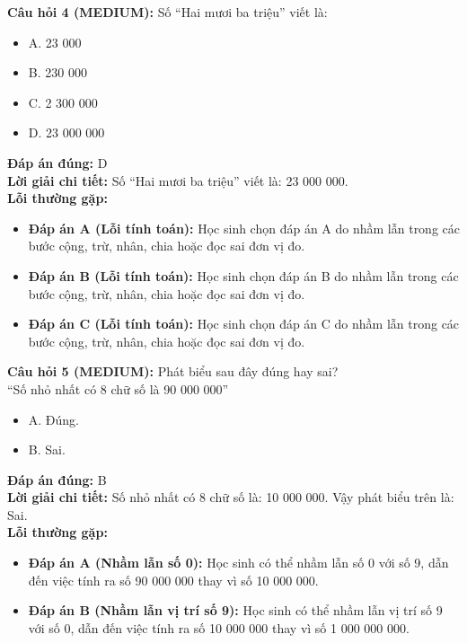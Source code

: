 \documentclass{article}
\begin{document}
\begin{minipage}{\textwidth}
\noindent\textbf{Câu hỏi 4 (MEDIUM):} Số “Hai mươi ba triệu” viết là: 
\begin{itemize}[label={}]
    \item A. 23 000
    \item B. 230 000
    \item C. 2 300 000
    \item D. 23 000 000
\end{itemize}
\textbf{Đáp án đúng:} D \\
\textbf{Lời giải chi tiết:} Số “Hai mươi ba triệu” viết là: 23 000 000. \\
\textbf{Lỗi thường gặp:}
\begin{itemize}
  \item \textbf{Đáp án A (Lỗi tính toán):} Học sinh chọn đáp án A do nhầm lẫn trong các bước cộng, trừ, nhân, chia hoặc đọc sai đơn vị đo.
  \item \textbf{Đáp án B (Lỗi tính toán):} Học sinh chọn đáp án B do nhầm lẫn trong các bước cộng, trừ, nhân, chia hoặc đọc sai đơn vị đo.
  \item \textbf{Đáp án C (Lỗi tính toán):} Học sinh chọn đáp án C do nhầm lẫn trong các bước cộng, trừ, nhân, chia hoặc đọc sai đơn vị đo.
\end{itemize}
\end{minipage}
\vspace{1em}

\begin{minipage}{\textwidth}
\noindent\textbf{Câu hỏi 5 (MEDIUM):} Phát biểu sau đây đúng hay sai? \\
“Số nhỏ nhất có 8 chữ số là 90 000 000” 
\begin{itemize}[label={}]
    \item A. Đúng.
    \item B. Sai.
\end{itemize}
\textbf{Đáp án đúng:} B \\
\textbf{Lời giải chi tiết:} Số nhỏ nhất có 8 chữ số là: 10 000 000. Vậy phát biểu trên là: Sai. \\
\textbf{Lỗi thường gặp:}
\begin{itemize}
  \item \textbf{Đáp án A (Nhầm lẫn số 0):} Học sinh có thể nhầm lẫn số 0 với số 9, dẫn đến việc tính ra số 90 000 000 thay vì số 10 000 000.
  \item \textbf{Đáp án B (Nhầm lẫn vị trí số 9):} Học sinh có thể nhầm lẫn vị trí số 9 với số 0, dẫn đến việc tính ra số 10 000 000 thay vì số 1 000 000 000.
\end{itemize}
\end{minipage}
\vspace{1em}
\end{document}
